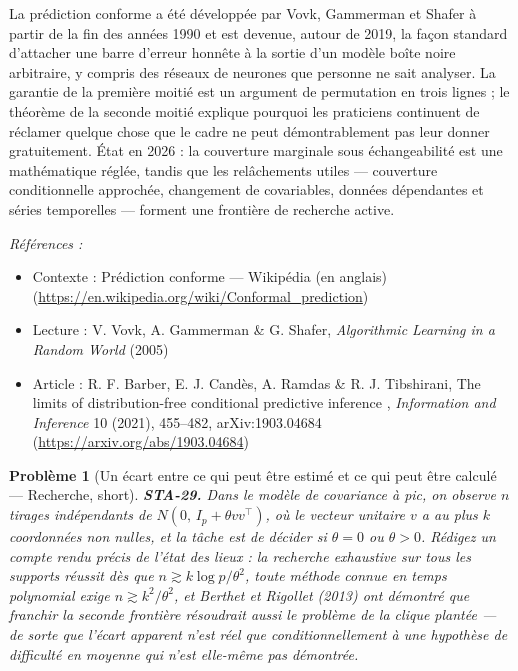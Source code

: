 \documentclass[11pt]{article}
\newtheorem{problem}{Problème}
\newenvironment{refs}{\par\small\noindent\emph{Références :}\begin{itemize}\setlength\itemsep{0pt}}{\end{itemize}\normalsize}
\begin{document}
\noindent La prédiction conforme a été développée par Vovk, Gammerman et Shafer à partir
de la fin des années 1990 et est devenue, autour de 2019, la façon standard d'attacher une barre
d'erreur honnête à la sortie d'un modèle boîte noire arbitraire, y compris des réseaux de neurones
que personne ne sait analyser. La garantie de la première moitié est un argument de permutation en
trois lignes ; le théorème de la seconde moitié explique pourquoi les praticiens continuent de
réclamer quelque chose que le cadre ne peut démontrablement pas leur donner gratuitement. État en
2026 : la couverture marginale sous échangeabilité est une mathématique réglée, tandis que les
relâchements utiles --- couverture conditionnelle approchée, changement de covariables, données
dépendantes et séries temporelles --- forment une frontière de recherche active.

\begin{refs}
\item Contexte : Prédiction conforme --- Wikipédia (en anglais) (\url{https://en.wikipedia.org/wiki/Conformal_prediction})
\item Lecture : V. Vovk, A. Gammerman \& G. Shafer, \textit{Algorithmic Learning in a Random World} (2005)
\item Article : R. F. Barber, E. J. Candès, A. Ramdas \& R. J. Tibshirani, \og{} The limits of distribution-free conditional predictive inference \fg{}, \textit{Information and Inference} 10 (2021), 455--482, arXiv:1903.04684 (\url{https://arxiv.org/abs/1903.04684})
\end{refs}

\bigskip

\begin{problem}[{Un écart entre ce qui peut être estimé et ce qui peut être calculé --- Recherche, short}]
\textbf{STA-29.} Dans le modèle de covariance à pic, on observe $ n $
tirages indépendants de $ N(0,\, I_p + \theta vv^{\top}) $, où le vecteur unitaire $ v $ a au
plus $ k $ coordonnées non nulles, et la tâche est de décider si $ \theta = 0 $ ou
$ \theta >0 $. Rédigez un compte rendu précis de l'état des lieux : la recherche exhaustive
sur tous les supports réussit dès que $ n \gtrsim k \log p / \theta^2 $, toute méthode connue en
temps polynomial exige $ n \gtrsim k^2 / \theta^2 $, et Berthet et Rigollet (2013) ont démontré
que franchir la seconde frontière résoudrait aussi le problème de la clique plantée --- de sorte que
l'écart apparent n'est réel que conditionnellement à une hypothèse de difficulté en moyenne qui
n'est elle-même pas démontrée.
\end{problem}
\end{document}
